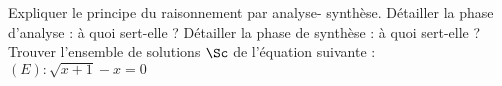 %
%
	\begin{tasks}
		\task Expliquer le principe du raisonnement par analyse- synthèse.
		\task Détailler la phase d'analyse : à quoi sert-elle ?
		\task Détailler la phase de synthèse : à quoi sert-elle ?
		\task Trouver l'ensemble de solutions $\Sc$ de l'équation suivante :$(E) : \sqrt{x+1} -x=0$
	\end{tasks}
